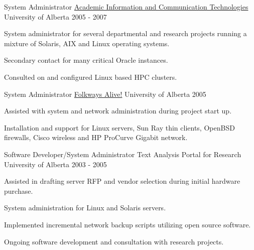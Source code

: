 \begin{cventries}
  \cventry
    {System Administrator} %
    {\href{https://ist.ualberta.ca/}{Academic Information and Communication Technologies}} %
    {University of Alberta} %
    {2005 - 2007} %
    {
      \begin{cvitems} %
        \item {System administrator for several departmental and research projects running a mixture of Solaris, AIX and Linux operating systems.}
        \item {Secondary contact for many critical Oracle instances.}
        \item {Consulted on and configured Linux based HPC clusters.}
      \end{cvitems}
    }

  \cventry
    {System Administrator} %
    {\href{http://folkwaysalive.ualberta.ca/}{Folkways Alive!}} %
    {University of Alberta} %
    {2005} %
    {
      \begin{cvitems} %
        \item {Assisted with system and network administration during project start up.}
        \item {Installation and support for Linux servers, Sun Ray thin clients, OpenBSD firewalls, Cisco wireless and HP ProCurve Gigabit network.}
      \end{cvitems}
    }

  \cventry
    {Software Developer/System Administrator} %
    {Text Analysis Portal for Research} %
    {University of Alberta} %
    {2003 - 2005} %
    {
      \begin{cvitems} %
        \item {Assisted in drafting server RFP and vendor selection during initial hardware purchase.}
        \item {System administration for Linux and Solaris servers.}
        \item {Implemented incremental network backup scripts utilizing open source software.}
        \item{Ongoing software development and consultation with research projects.}
      \end{cvitems}
    }


\end{cventries}
